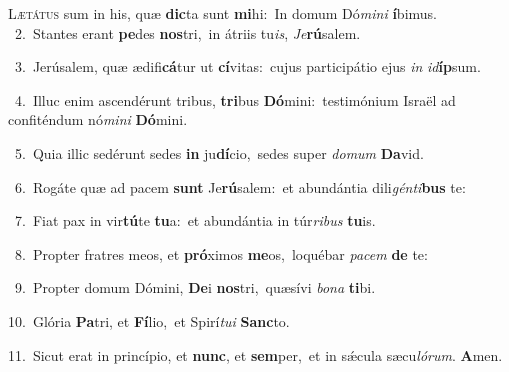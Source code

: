 \lettrine{\initial\textcolor{\initialcolor}{L}}{ætátus} sum in his, quæ \textbf{dic}\-ta sunt \textbf{mi}\-hi:~\star In domum Dó\-\textit{mi}\-\textit{ni} \textbf{í}\-bimus.\\
{\numbfont\textcolor{\numbcolor}{~2.}}~Stantes erant \textbf{pe}\-des \textbf{nos}\-tri,~\star in átriis tu\-\textit{is}\-, \textit{Je}\-\textbf{rú}salem.\par
{\numbfont\textcolor{\numbcolor}{~3.}}~Jerúsalem, quæ ædifi\-\textbf{cá}\-tur ut \textbf{cí}\-vitas:~\star cujus participátio ejus \textit{in} \textit{id}\-\textbf{íp}sum.\par
{\numbfont\textcolor{\numbcolor}{~4.}}~Illuc enim ascendérunt tribus, \textbf{tri}\-bus \textbf{Dó}\-mini:~\star testimónium Israël ad confiténdum nó\-\textit{mi}\-\textit{ni} \textbf{Dó}\-mini.\par
{\numbfont\textcolor{\numbcolor}{~5.}}~Quia illic sedérunt sedes \textbf{in} ju\-\textbf{dí}\-cio,~\star sedes super \textit{do}\-\textit{mum} \textbf{Da}\-vid.\par
{\numbfont\textcolor{\numbcolor}{~6.}}~Rogáte quæ ad pacem \textbf{sunt} Je\-\textbf{rú}\-salem:~\star et abundántia dili\-\textit{gén}\-\textit{ti}\textbf{bus} te:\par
{\numbfont\textcolor{\numbcolor}{~7.}}~Fiat pax in vir\-\textbf{tú}\-te \textbf{tu}\-a:~\star et abundántia in túr\-\textit{ri}\-\textit{bus} \textbf{tu}\-is.\par
{\numbfont\textcolor{\numbcolor}{~8.}}~Propter fratres meos, et \textbf{pró}\-ximos \textbf{me}\-os,~\star loquébar \textit{pa}\-\textit{cem} \textbf{de} te:\par
{\numbfont\textcolor{\numbcolor}{~9.}}~Propter domum Dómini, \textbf{De}\-i \textbf{nos}\-tri,~\star quæsívi \textit{bo}\-\textit{na} \textbf{ti}\-bi.\par
{\numbfont\textcolor{\numbcolor}{10.}}~Glória \textbf{Pa}\-tri, et \textbf{Fí}\-lio,~\star et Spirí\-\textit{tu}\-\textit{i} \textbf{Sanc}\-to.\par
{\numbfont\textcolor{\numbcolor}{11.}}~Sicut erat in princípio, et \textbf{nunc}\-, et \textbf{sem}\-per,~\star et in sǽcula sæcu\-\textit{ló}\-\textit{rum}. \textbf{A}\-men.\par
